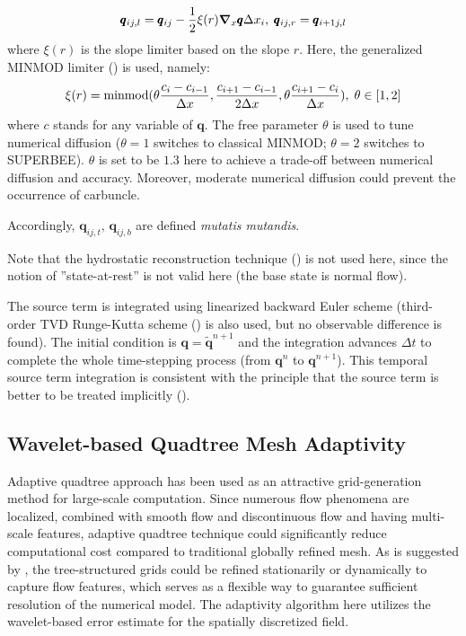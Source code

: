 \documentclass{jfm}
\begin{document}
\begin{equation}
\pmb{q}_{ij,l}=\pmb{q}_{ij}-\frac{1}{2}\xi(r){\grad}_x \pmb{q}\Delta x_i,\;
\pmb{q}_{ij,r}=\pmb{q}_{i+1j,l}
\end{equation}
where $\xi(r)$ is the slope limiter based on the slope $r$.
Here, the generalized MINMOD limiter (\cite{Kurganov2002b}) is used, namely:
\begin{equation}
\xi(r) = {\rm{minmod}}(\theta\frac{c_i-c_{i-1}}{\Delta x},  \frac{c_{i+1}-c_{i-1}}{2\Delta x},  \theta\frac{c_{i+1}-c_i}{\Delta x}),\;\theta \in [1,2]
\label{gminmod}
\end{equation}
where $c$ stands for any variable of $\pmb{q}$. The free parameter $\theta$ is used to tune numerical diffusion ($\theta=1$ switches to classical MINMOD; $\theta=2$ switches to SUPERBEE). $\theta$ is set to be $1.3$ here to achieve a trade-off between numerical diffusion and accuracy. Moreover, moderate numerical diffusion could prevent the occurrence of carbuncle.


Accordingly, $\pmb{q}_{ij,t},\,\pmb{q}_{ij,b}$ are defined \textit{mutatis mutandis}.

Note that the hydrostatic reconstruction technique (\cite{Audusse2004}) is not used here, since the notion of  ''state-at-rest'' is not valid here (the base state is normal flow).

The source term is integrated using  linearized backward Euler scheme (third-order TVD Runge-Kutta scheme (\cite{Shu1988}) is also used, but no observable difference is found).  The initial condition is $\pmb{q}=\tilde{\pmb{q}}^{n+1}$ and the integration advances $\Delta t$ to complete the whole time-stepping process (from $\pmb{q}^{n}$ to $\pmb{q}^{n+1}$). This temporal source term integration is consistent with the principle that the source term is better to be treated implicitly (\cite{Pareschi2005}).

\subsection{Wavelet-based Quadtree Mesh Adaptivity}
Adaptive quadtree approach has been used as an attractive grid-generation method for large-scale computation. Since numerous flow phenomena are localized, combined with smooth flow and discontinuous flow and having multi-scale features, adaptive quadtree technique could significantly reduce computational cost compared to traditional globally refined mesh. As is suggested by  \cite{Popinet2003}, the  tree-structured grids could be refined stationarily or dynamically to capture flow features, which serves as a flexible way to guarantee sufficient resolution of the numerical model. The adaptivity algorithm here utilizes the wavelet-based error estimate for the spatially discretized field. 
\end{document}

